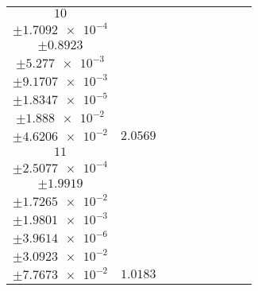 \documentclass[8pt]{article}
\begin{document}
\begin{longtable}[l]{c c c c c c c c c}
$\num{10}$ & \begin{tabular}[c]{@{}c@{}}$\num{2.8068e-2}$ \\ $\pm\num{1.7092e-4}$\end{tabular} & \begin{tabular}[c]{@{}c@{}}$\num{-0.89883}$ \\ $\pm\num{0.8923}$\end{tabular} & \begin{tabular}[c]{@{}c@{}}$\num{3.7202}$ \\ $\pm\num{5.277e-3}$\end{tabular} & \begin{tabular}[c]{@{}c@{}}$\num{1.5782e+3}$ \\ $\pm\num{9.1707e-3}$\end{tabular} & \begin{tabular}[c]{@{}c@{}}$\num{3.1573}$ \\ $\pm\num{1.8347e-5}$\end{tabular} & \begin{tabular}[c]{@{}c@{}}$\num{2.3708}$ \\ $\pm\num{1.888e-2}$\end{tabular} & \begin{tabular}[c]{@{}c@{}}$\num{5.0561}$ \\ $\pm\num{4.6206e-2}$\end{tabular} & $\num{2.0569}$\\
$\num{11}$ & \begin{tabular}[c]{@{}c@{}}$\num{1.3746e-2}$ \\ $\pm\num{2.5077e-4}$\end{tabular} & \begin{tabular}[c]{@{}c@{}}$\num{-0.99408}$ \\ $\pm\num{1.9919}$\end{tabular} & \begin{tabular}[c]{@{}c@{}}$\num{5.5434}$ \\ $\pm\num{1.7265e-2}$\end{tabular} & \begin{tabular}[c]{@{}c@{}}$\num{1.58e+3}$ \\ $\pm\num{1.9801e-3}$\end{tabular} & \begin{tabular}[c]{@{}c@{}}$\num{3.1609}$ \\ $\pm\num{3.9614e-6}$\end{tabular} & \begin{tabular}[c]{@{}c@{}}$\num{2.3976}$ \\ $\pm\num{3.0923e-2}$\end{tabular} & \begin{tabular}[c]{@{}c@{}}$\num{4.4955}$ \\ $\pm\num{7.7673e-2}$\end{tabular} & $\num{1.0183}$\\

\end{longtable}
\end{document}
